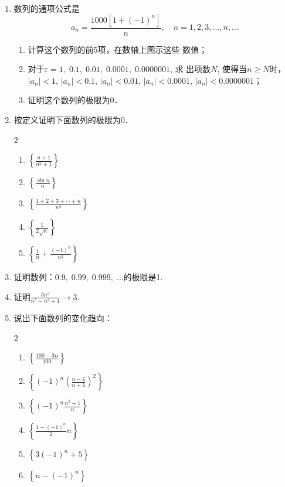 \begin{enumerate}
    \item 数列的通项公式是
\[a_n=\frac{1000[1+(-1)^n]}{n},\quad n=1,2,3,\ldots,n,\ldots\]
\begin{enumerate}
    \item 计算这个数列的前5项，在数轴上图示这些
    数值；
    \item 对于$\varepsilon=1,\; 0.1,\; 0.01,\; 0.0001,\; 0.0000001$, 求
    出项数$N$, 使得当$n\ge N$时，$|a_n|<1$, $|a_n|<0.1$, $|a_n|<0.01$, $|a_n|<0.0001$, $|a_n|<0.0000001$；
    \item 证明这个数列的极限为0．
\end{enumerate}

    \item 按定义证明下面数列的极限为0．
\begin{multicols}{2}
\begin{enumerate}
    \item $\left\{\frac{n+1}{n^2+1}\right\}$
    \item $\left\{\frac{\sin n}{n}\right\}$
    \item $\left\{\frac{1+2+3+\cdots+n}{n^3}\right\}$
    \item $\left\{\frac{1}{2\sqrt{n}}\right\}$
    \item $\left\{\frac{1}{n}+\frac{(-1)^n}{n^2}\right\}$
\end{enumerate}
\end{multicols}
    \item 证明数列：$0.9,\;0.99,\;0.999,\;\ldots$的极限是1.

    \item 证明$\frac{3n^5}{n^5-n^2+1}\to 3$.
    \item 说出下面数列的变化趋向：
\begin{multicols}{2}
\begin{enumerate}
    \item $\left\{\frac{100-3n}{100}\right\}$
    \item $\left\{(-1)^n\left(\frac{n-1}{n+1}\right)^2\right\}$
    \item $\left\{(-1)^n\frac{n^2+1}{n}\right\}$
    \item $\left\{\frac{1-(-1)^n}{2}n\right\}$
    \item $\left\{3(-1)^n+5\right\}$
    \item $\left\{n-(-1)^n\right\}$
\end{enumerate}
\end{multicols}
\end{enumerate}

